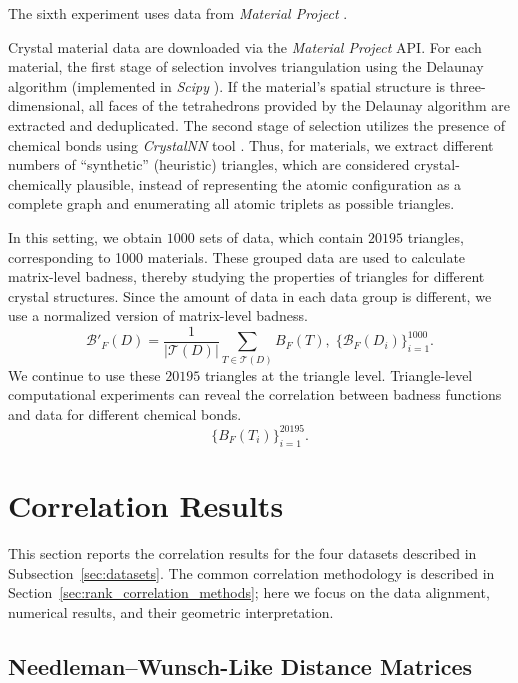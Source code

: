 \documentclass[11pt]{article}
\begin{document}
The sixth experiment uses data from \textit{Material Project} \cite{jain2013MP,horton2025MP}. 

Crystal material data are downloaded via the \textit{Material Project} API. For each material, the first stage of selection involves triangulation using the Delaunay algorithm \cite{rebay1993mesh,mark2008Delaunay} (implemented in \textit{Scipy} \cite{virtanen2020scipy}). If the material's spatial structure is three-dimensional, all faces of the tetrahedrons provided by the Delaunay algorithm are extracted and deduplicated. The second stage of selection utilizes the presence of chemical bonds using \textit{CrystalNN} tool \cite{pan2021crystalNN,ong2013pymatgen}. Thus, for materials, we extract different numbers of ``synthetic'' (heuristic) triangles, which are considered crystal-chemically plausible, instead of representing the atomic configuration as a complete graph and enumerating all atomic triplets as possible triangles. 

In this setting, we obtain \(1000\) sets of data, which contain \(20195\) triangles, corresponding to 1000 materials. These grouped data are used to calculate matrix-level badness, thereby studying the properties of triangles for different crystal structures. 
Since the amount of data in each data group is different, we use a normalized version of matrix-level badness.
\[
\mathcal{B}'_F(D) = \frac{1}{|\mathcal{T}(D)|}\sum_{T\in\mathcal{T}(D)}B_F(T),\;
\{\mathcal{B}_F(D_i)\}_{i=1}^{1000}.
\]
We continue to use these \(20195\) triangles at the triangle level. Triangle-level computational experiments can reveal the correlation between badness functions and data for different chemical bonds.
\[\{B_F(T_i)\}_{i=1}^{20195}.\]

\section{Correlation Results}
\label{sec:correlation_results}

This section reports the correlation results for the four datasets described in Subsection~\ref{sec:datasets}. The common correlation methodology is described in Section~\ref{sec:rank_correlation_methods}; here we focus on the data alignment, numerical results, and their geometric interpretation.

\subsection{Needleman--Wunsch-Like Distance Matrices}
\label{sec:nw_like_correlation_results}
\end{document}
